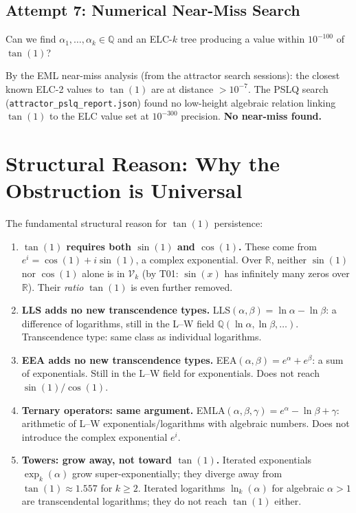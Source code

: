 \documentclass[11pt]{article}
\begin{document}
\subsection{Attempt 7: Numerical Near-Miss Search}

Can we find $\alpha_1, \ldots, \alpha_k \in \mathbb{Q}$ and an ELC-$k$ tree
producing a value within $10^{-100}$ of $\tan(1)$?

By the EML near-miss analysis (from the attractor search sessions):
the closest known ELC-2 values to $\tan(1)$ are at distance $> 10^{-7}$.
The PSLQ search (\texttt{attractor\_pslq\_report.json}) found no
low-height algebraic relation linking $\tan(1)$ to the ELC value set
at $10^{-300}$ precision. \textbf{No near-miss found.}

\section{Structural Reason: Why the Obstruction is Universal}
\label{sec:structural}

The fundamental structural reason for $\tan(1)$ persistence:

\begin{enumerate}
  \item \textbf{$\tan(1)$ requires both $\sin(1)$ and $\cos(1)$.}
        These come from $e^i = \cos(1) + i\sin(1)$, a complex exponential.
        Over $\mathbb{R}$, neither $\sin(1)$ nor $\cos(1)$ alone is in $\mathcal{V}_k$
        (by T01: $\sin(x)$ has infinitely many zeros over $\mathbb{R}$).
        Their \emph{ratio} $\tan(1)$ is even further removed.

  \item \textbf{LLS adds no new transcendence types.}
        LLS$(\alpha,\beta) = \ln\alpha - \ln\beta$: a difference of logarithms,
        still in the L--W field $\mathbb{Q}(\ln\alpha, \ln\beta, \ldots)$.
        Transcendence type: same class as individual logarithms.

  \item \textbf{EEA adds no new transcendence types.}
        EEA$(\alpha,\beta) = e^\alpha + e^\beta$: a sum of exponentials.
        Still in the L--W field for exponentials. Does not reach $\sin(1)/\cos(1)$.

  \item \textbf{Ternary operators: same argument.}
        EMLA$(\alpha,\beta,\gamma) = e^\alpha - \ln\beta + \gamma$:
        arithmetic of L--W exponentials/logarithms with algebraic numbers.
        Does not introduce the complex exponential $e^i$.

  \item \textbf{Towers: grow away, not toward $\tan(1)$.}
        Iterated exponentials $\exp_k(\alpha)$ grow super-exponentially;
        they diverge away from $\tan(1) \approx 1.557$ for $k \geq 2$.
        Iterated logarithms $\ln_k(\alpha)$ for algebraic $\alpha > 1$ are
        transcendental logarithms; they do not reach $\tan(1)$ either.
\end{enumerate}
\end{document}
